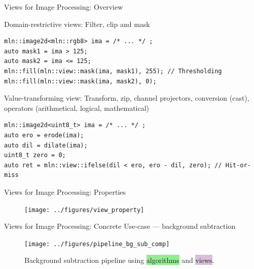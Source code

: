 \documentclass[12pt,aspectratio=169]{beamer}
\begin{document}
\begin{frame}[fragile]{Views for Image Processing: Overview}
  \begin{alertblock}{Domain-restrictive views:}
    Filter, clip and mask
    \begin{verbatim}
mln::image2d<mln::rgb8> ima = /* ... */ ;
auto mask1 = ima > 125;
auto mask2 = ima <= 125;
mln::fill(mln::view::mask(ima, mask1), 255); // Thresholding
mln::fill(mln::view::mask(ima, mask2), 0);
    \end{verbatim}
  \end{alertblock}

  \begin{alertblock}{Value-transforming view:}
    Transform, zip, channel projectors, conversion (cast), operators (arithmetical, logical, mathematical)
    \begin{verbatim}
mln::image2d<uint8_t> ima = /* ... */ ;
auto ero = erode(ima);
auto dil = dilate(ima);
uint8_t zero = 0;
auto ret = mln::view::ifelse(dil < ero, ero - dil, zero); // Hit-or-miss
    \end{verbatim}
  \end{alertblock}
\end{frame}

\begin{frame}[fragile]{Views for Image Processing: Properties}
  \centering
  \begin{figure}
    \texttt{[image: ../figures/view\_property]}
  \end{figure}
\end{frame}

\begin{frame}[fragile]{Views for Image Processing: Concrete Use-case --- background subtraction}
  \begin{figure}[htbp]
    \centering
    \texttt{[image: ../figures/pipeline\_bg\_sub\_comp]}
    \caption{Background subtraction pipeline using \colorbox{lightgreen}{algorithms} and
      \colorbox{thistle}{views}.}
  \end{figure}
\end{frame}
\end{document}
